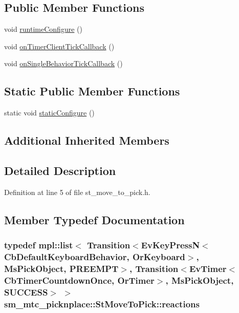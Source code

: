 \subsection*{Public Member Functions}
\begin{DoxyCompactItemize}
\item 
void \hyperlink{structsm__mtc__picknplace_1_1StMoveToPick_a792081d07b131ea0428ddd3d7620ea6c}{runtime\+Configure} ()
\item 
void \hyperlink{structsm__mtc__picknplace_1_1StMoveToPick_a78cd943ef4f0c0ac0f31f761d9ffc7b4}{on\+Timer\+Client\+Tick\+Callback} ()
\item 
void \hyperlink{structsm__mtc__picknplace_1_1StMoveToPick_abec39f8ab3804503313111550175f747}{on\+Single\+Behavior\+Tick\+Callback} ()
\end{DoxyCompactItemize}
\subsection*{Static Public Member Functions}
\begin{DoxyCompactItemize}
\item 
static void \hyperlink{structsm__mtc__picknplace_1_1StMoveToPick_a66e46a37b1a00706d354d4bfd153d894}{static\+Configure} ()
\end{DoxyCompactItemize}
\subsection*{Additional Inherited Members}


\subsection{Detailed Description}


Definition at line 5 of file st\+\_\+move\+\_\+to\+\_\+pick.\+h.



\subsection{Member Typedef Documentation}
\subsubsection[{\texorpdfstring{reactions}{reactions}}]{\setlength{\rightskip}{0pt plus 5cm}typedef mpl\+::list$<$ Transition$<$Ev\+Key\+PressN$<$Cb\+Default\+Keyboard\+Behavior, {\bf Or\+Keyboard}$>$, {\bf Ms\+Pick\+Object}, {\bf P\+R\+E\+E\+M\+PT}$>$, Transition$<$Ev\+Timer$<$Cb\+Timer\+Countdown\+Once, {\bf Or\+Timer}$>$, {\bf Ms\+Pick\+Object}, {\bf S\+U\+C\+C\+E\+SS}$>$ $>$ {\bf sm\+\_\+mtc\+\_\+picknplace\+::\+St\+Move\+To\+Pick\+::reactions}}\hypertarget{structsm__mtc__picknplace_1_1StMoveToPick_a959271af5d1a2713f1342b3cdbc99f83}{}\label{structsm__mtc__picknplace_1_1StMoveToPick_a959271af5d1a2713f1342b3cdbc99f83}


